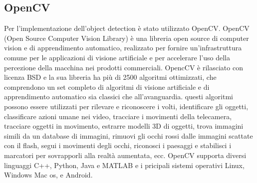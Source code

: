 \subsection{OpenCV}
Per l'implementazione dell'object detection è stato utilizzato OpenCV. OpenCV (Open Source Computer Vision Library) è una libreria open source di computer vision e di apprendimento automatico, realizzato per fornire un'infrastruttura comune per le applicazioni di visione artificiale e per accelerare l'uso della percezione della macchina nei prodotti commerciali. OpencCV è rilasciato con licenza BSD e la sua libreria ha più di 2500 algoritmi ottimizzati, che comprendono un set completo di algoritmi di visione artificiale e di apprendimento automatico sia classici che all'avanguardia. questi algoritmi possono essere utilizzati per rilevare e riconoscere i volti, identificare gli oggetti, classificare azioni umane nei video, tracciare i movimenti della telecamera, tracciare oggetti in movimento, estrarre modelli 3D di oggetti, trova immagini simili da un database di immagini, rimuovi gli occhi rossi dalle immagini scattate con il flash, segui i movimenti degli occhi, riconosci i paesaggi e stabilisci i marcatori per sovrapporli alla realtà aumentata, ecc. OpenCV supporta diversi linguaggi C++, Python, Java e MATLAB e i pricipali sistemi operativi Linux, Windows Mac os, e Android.
